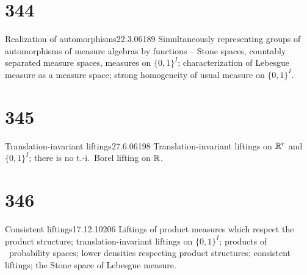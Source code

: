\section{344}{Realization of automorphisms}{22.3.06}{189}{}
{Simultaneously representing groups of automorphisms of
measure algebras by functions -- Stone spaces,
countably separated measure spaces,
measures on $\{0,1\}^I$;  characterization of Lebesgue measure as a
measure space;  strong homogeneity of usual measure on $\{0,1\}^I$.}
     
\section{345}{Translation-invariant liftings}{27.6.06}{198}{}
{Translation-invariant liftings on $\Bbb{R}^r$ and $\{0,1\}^I$;
there is no t.-i.\ Borel lifting on $\Bbb{R}$.}
     
\section{346}{Consistent liftings}{17.12.10}{206}{}
{Liftings of product measures which respect the product structure;
translation-invariant liftings on $\{0,1\}^I$;  products of \Mth\
probability spaces;  lower densities respecting product
structures;  consistent liftings;  the Stone space of Lebesgue measure.}
     
     


